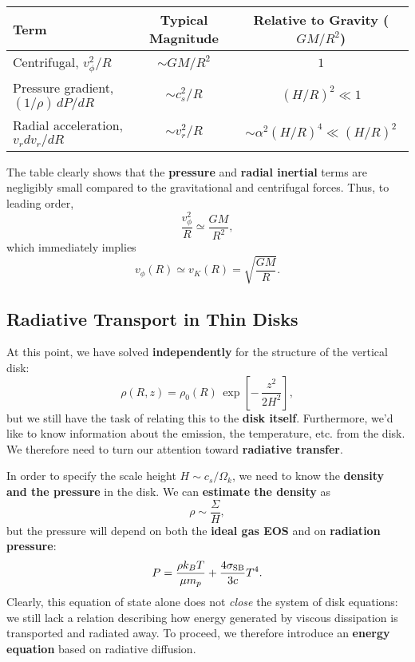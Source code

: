 \begin{center}
\renewcommand{\arraystretch}{1.4}
\begin{tabular}{lcc}
\toprule
\textbf{Term} & \textbf{Typical Magnitude} & \textbf{Relative to Gravity ($GM/R^2$)} \\
\midrule
Centrifugal, $v_\phi^2/R$ & $\sim GM/R^2$ & $1$ \\
Pressure gradient, $(1/\rho)\,dP/dR$ & $\sim c_s^2 / R$ & $(H/R)^2 \ll 1$ \\
Radial acceleration, $v_r dv_r/dR$ & $\sim v_r^2 / R$ & $\sim \alpha^2 (H/R)^4 \ll (H/R)^2$ \\
\bottomrule
\end{tabular}
\end{center}

The table clearly shows that the \textbf{pressure} and \textbf{radial inertial} terms are negligibly small compared to the gravitational and centrifugal forces. Thus, to leading order,
\begin{equation}
\frac{v_\phi^2}{R} \simeq \frac{GM}{R^2},
\end{equation}
which immediately implies
\begin{equation}
\boxed{
v_\phi(R) \simeq v_K(R) = \sqrt{\frac{GM}{R}}.
}
\end{equation}

\subsection{Radiative Transport in Thin Disks}

At this point, we have solved \textbf{independently} for the structure of the vertical disk:
\[
\rho(R,z) = \rho_0(R)\,
\exp\!\left[-\,\frac{z^2}{2H^2}\right],
\]
but we still have the task of relating this to the \textbf{disk itself}. Furthermore, we'd like to know information about the emission, the temperature, etc. from the disk. We therefore need to turn our attention toward \textbf{radiative transfer}.
\par
In order to specify the scale height $H \sim c_s/\Omega_k$, we need to know the \textbf{density and the pressure} in the disk. We can \textbf{estimate the density} as 
\[
\rho \sim \frac{\Sigma}{H},
\]
but the pressure will depend on both the \textbf{ideal gas EOS} and on \textbf{radiation pressure}:
\[
P = \frac{\rho k_B T}{\mu m_p} + \frac{4\sigma_{\rm SB}}{3c}T^4.
\]
\bigskip
\noindent
Clearly, this equation of state alone does not \emph{close} the system of disk equations: we still lack a relation describing how energy generated by viscous dissipation is transported and radiated away. To proceed, we therefore introduce an \textbf{energy equation} based on radiative diffusion.

